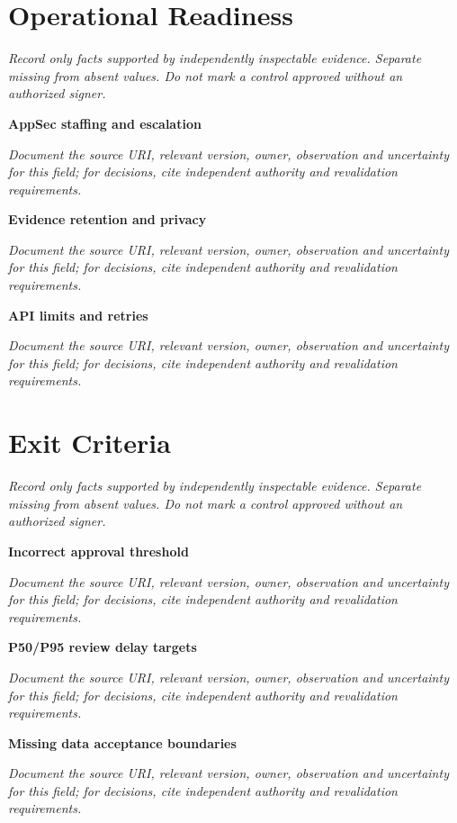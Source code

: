 \documentclass[11pt,letterpaper]{article}
\begin{document}
\section{Operational Readiness}
\noindent\emph{Record only facts supported by independently inspectable evidence. Separate missing from absent values. Do not mark a control approved without an authorized signer.}\par
\noindent\textbf{AppSec staffing and escalation}\par
\noindent\emph{Document the source URI, relevant version, owner, observation and uncertainty for this field; for decisions, cite independent authority and revalidation requirements.}\par\medskip
\noindent\textbf{Evidence retention and privacy}\par
\noindent\emph{Document the source URI, relevant version, owner, observation and uncertainty for this field; for decisions, cite independent authority and revalidation requirements.}\par\medskip
\noindent\textbf{API limits and retries}\par
\noindent\emph{Document the source URI, relevant version, owner, observation and uncertainty for this field; for decisions, cite independent authority and revalidation requirements.}\par\medskip
\section{Exit Criteria}
\noindent\emph{Record only facts supported by independently inspectable evidence. Separate missing from absent values. Do not mark a control approved without an authorized signer.}\par
\noindent\textbf{Incorrect approval threshold}\par
\noindent\emph{Document the source URI, relevant version, owner, observation and uncertainty for this field; for decisions, cite independent authority and revalidation requirements.}\par\medskip
\noindent\textbf{P50/P95 review delay targets}\par
\noindent\emph{Document the source URI, relevant version, owner, observation and uncertainty for this field; for decisions, cite independent authority and revalidation requirements.}\par\medskip
\noindent\textbf{Missing data acceptance boundaries}\par
\noindent\emph{Document the source URI, relevant version, owner, observation and uncertainty for this field; for decisions, cite independent authority and revalidation requirements.}\par\medskip
\end{document}
